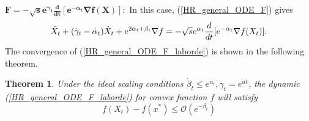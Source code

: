 \documentclass{article}
\theoremstyle{plain}
\newtheorem{thm}{\textbf{Theorem}}
\theoremstyle{definition}
\theoremstyle{remark}
\begin{document}
$\boldsymbol {F = -\sqrt{s}e^{\gamma_t}\frac{d}{dt}[e^{-\alpha_t}\nabla f(X)]}:$ 
    In this case, (\ref{HR_general_ODE_F}) gives
    \begin{align}\label{HR_general_ODE_F_laborde}
    \Ddot{X}_t + (\dot{\gamma}_t-\dot{\alpha}_t)\dot{X}_t+e^{2\alpha_t+\beta_t}\nabla f = -\sqrt{s}e^{\alpha_t}\frac{d}{dt}[e^{-\alpha_t}\nabla f(X_t)].
\end{align}
The convergence of (\ref{HR_general_ODE_F_laborde}) is shown in the following theorem.
\begin{thm}\label{Theorem_ODE_laborde}
Under the ideal scaling conditions $\dot\beta_t\leq e^{\alpha_t}, \dot\gamma_t=e^{\alpha t}$, the dynamic (\ref{HR_general_ODE_F_laborde}) for convex function $f$ will satisfy 
$$f(X_t)-f(x^*)\leq \mathcal{O}(e^{-\beta_t})$$
\end{thm}
\end{document}
